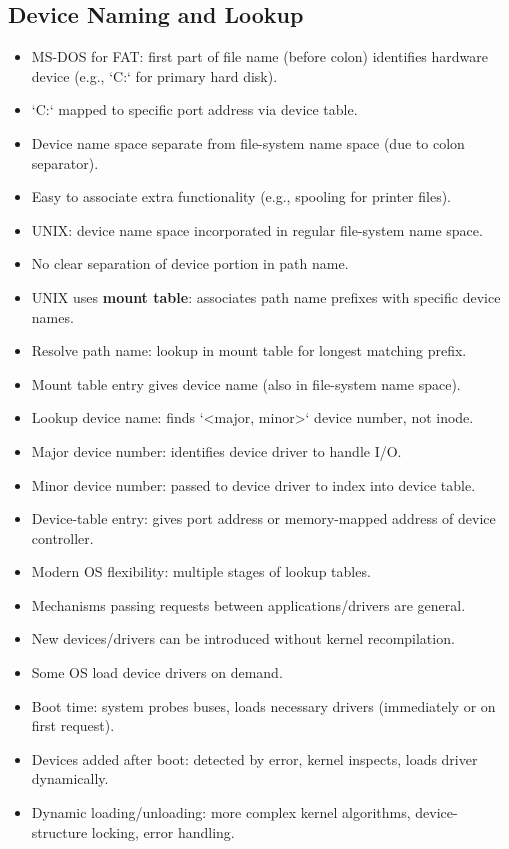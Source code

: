 \subsection{Device Naming and Lookup}
\begin{itemize}
    \item MS-DOS for FAT: first part of file name (before colon) identifies hardware device (e.g., `C:` for primary hard disk).
    \item `C:` mapped to specific port address via device table.
    \item Device name space separate from file-system name space (due to colon separator).
    \item Easy to associate extra functionality (e.g., spooling for printer files).
    \item UNIX: device name space incorporated in regular file-system name space.
    \item No clear separation of device portion in path name.
    \item UNIX uses \textbf{mount table}: associates path name prefixes with specific device names.
    \item Resolve path name: lookup in mount table for longest matching prefix.
    \item Mount table entry gives device name (also in file-system name space).
    \item Lookup device name: finds `<major, minor>` device number, not inode.
    \item Major device number: identifies device driver to handle I/O.
    \item Minor device number: passed to device driver to index into device table.
    \item Device-table entry: gives port address or memory-mapped address of device controller.
    \item Modern OS flexibility: multiple stages of lookup tables.
    \item Mechanisms passing requests between applications/drivers are general.
    \item New devices/drivers can be introduced without kernel recompilation.
    \item Some OS load device drivers on demand.
    \item Boot time: system probes buses, loads necessary drivers (immediately or on first request).
    \item Devices added after boot: detected by error, kernel inspects, loads driver dynamically.
    \item Dynamic loading/unloading: more complex kernel algorithms, device-structure locking, error handling.
\end{itemize}

